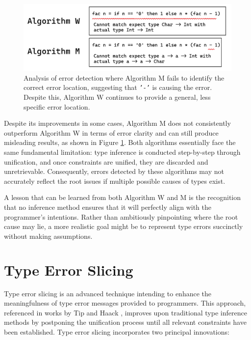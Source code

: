 \begin{figure}[hbt]
  \includegraphics[width=0.8\linewidth]{AlgorithmWM2}
  \caption{
    \label{fig:algorithm-m-2}
    Analysis of error detection where Algorithm M fails to identify the correct error location, suggesting that \texttt{'-'} is causing the error. Despite this, Algorithm W continues to provide a general, less specific error location.}
\end{figure}


Despite its improvements in some cases, Algorithm M does not consistently outperform Algorithm W in terms of error clarity and can still produce misleading results, as shown in Figure \ref{fig:algorithm-m-2}. Both algorithms essentially face the same fundamental limitation: type inference is conducted step-by-step through unification, and once constraints are unified, they are discarded and unretrievable. Consequently, errors detected by these algorithms may not accurately reflect the root issues if multiple possible causes of types exist.

A lesson that can be learned from both Algorithm W and M is the recognition that no inference method ensures that it will perfectly align with the programmer’s intentions. Rather than ambitiously pinpointing where the root cause may lie, a more realistic goal might be to represent type errors succinctly without making assumptions.


\section{Type Error Slicing}

Type error slicing is an advanced technique intending to enhance the meaningfulness of type error messages provided to programmers. This approach, referenced in works by Tip \cite{Tip2001-qn} and Haack \cite{Haack2004-fr}, improves upon traditional type inference methods by postponing the unification process until all relevant constraints have been established. Type error slicing incorporates two principal innovations:


